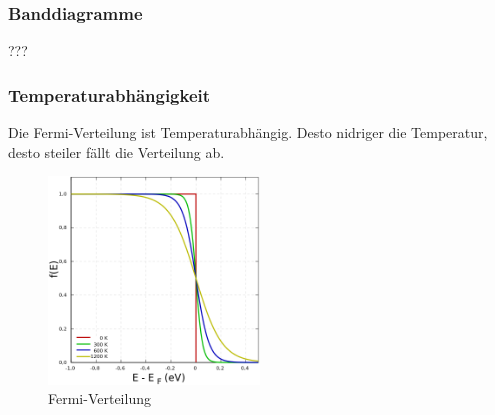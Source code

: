     \subsubsection{Banddiagramme}
    ???
    \subsubsection{Temperaturabh\"angigkeit}
    Die Fermi-Verteilung ist Temperaturabh\"angig. Desto nidriger die Temperatur, desto steiler f\"allt die Verteilung ab.
    \begin{figure}[H]
        \centering
        \includegraphics[width=0.5\textwidth]{fig/fermi}
        \caption{Fermi-Verteilung}
        \label{fig:fermi}
    \end{figure}